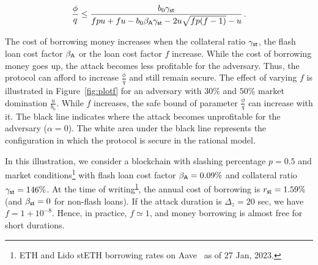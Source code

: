 \begin{gather*}
  \frac{\phi}{q} \leq \frac{b_0 \gamma_{\textsf{st}}}{f p u + f u - b_0 \beta_{\textsf{A}} \gamma_{\textsf{st}} - 2 u \sqrt{fp (f-1)} - u}\,.
\end{gather*}

The cost of borrowing money increases when the collateral ratio
$\gamma_{\textsf{st}}$, the flash loan cost factor $\beta_{\textsf{A}}$ or the loan cost factor $f$
increase. While the cost of borrowing money goes up, the attack becomes less profitable
for the adversary. Thus, the protocol can afford to increase $\frac{\phi}{q}$
and still remain secure. The effect of varying $f$ is illustrated in
Figure~\ref{fig:plotf} for an adversary with $30\%$ and $50\%$ market domination $\frac{u}{b_0}$.
While $f$ increases, the safe bound of parameter $\frac{\phi}{q}$ can increase with it.
The black line indicates where the attack becomes unprofitable for the adversary ($\alpha = 0$).
The white area under the black line represents the configuration in which
the protocol is secure in the rational model.


In this illustration,
we consider a blockchain with slashing percentage
$p = 0.5$ and market conditions\footnote{\label{footnote:aave}ETH and Lido stETH borrowing rates
on Aave~\cite{aave} as of 27 Jan, 2023.}
with \asset flash loan cost factor $\beta_{\textsf{A}} = 0.09\%$ and
collateral ratio $\gamma_{\textsf{st}} = 146\%$.
At the time of writing\textsuperscript{\ref{footnote:aave}}, the annual cost of borrowing \stasset
is $r_{\textsf{st}} = 1.59\%$ (and $\beta_{\textsf{st}} = 0$ for non-flash loans).
If the attack duration is $\Delta_z = 20$ sec, we have
 $f = 1 + 10^{-8}$.
Hence, in practice, $f \simeq 1$, and money borrowing is almost free
for short durations.

